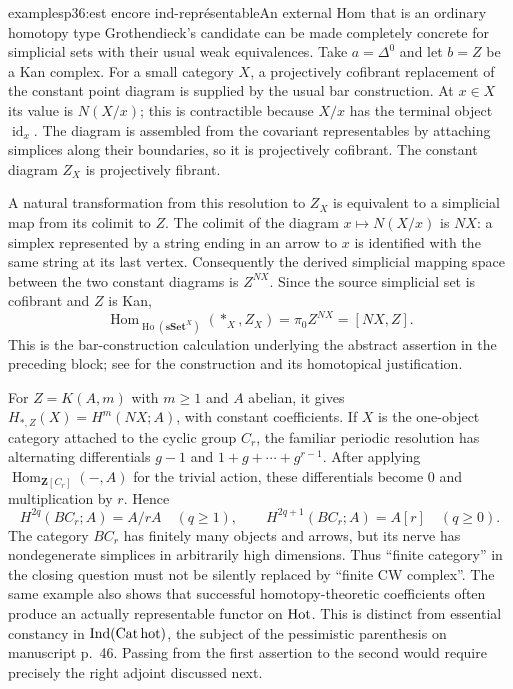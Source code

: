 \begin{dcomment}{examples}{p36:est encore ind-représentable}{An external Hom that is an ordinary homotopy type}
Grothendieck's candidate can be made completely concrete for simplicial sets with their usual weak equivalences. Take $a=\Delta^0$ and let $b=Z$ be a Kan complex. For a small category $X$, a projectively cofibrant replacement of the constant point diagram is supplied by the usual bar construction. At $x\in X$ its value is $N(X/x)$; this is contractible because $X/x$ has the terminal object $\operatorname{id}_x$. The diagram is assembled from the covariant representables by attaching simplices along their boundaries, so it is projectively cofibrant. The constant diagram $Z_X$ is projectively fibrant.

A natural transformation from this resolution to $Z_X$ is equivalent to a simplicial map from its colimit to $Z$. The colimit of the diagram $x\mapsto N(X/x)$ is $NX$: a simplex represented by a string ending in an arrow to $x$ is identified with the same string at its last vertex. Consequently the derived simplicial mapping space between the two constant diagrams is $Z^{NX}$. Since the source simplicial set is cofibrant and $Z$ is Kan,
\[
 \operatorname{Hom}_{\operatorname{Ho}(\mathbf{sSet}^{X})}
       (*_X,Z_X)=\pi_0 Z^{NX}=[NX,Z].
\]
This is the bar-construction calculation underlying the abstract assertion in the preceding block; see \citet[\S\S4.4--4.5 and 5.1]{Riehl2014} for the construction and its homotopical justification.

For $Z=K(A,m)$ with $m\geq1$ and $A$ abelian, it gives $H_{*,Z}(X)=H^m(NX;A)$, with constant coefficients. If $X$ is the one-object category attached to the cyclic group $C_r$, the familiar periodic resolution has alternating differentials $g-1$ and $1+g+\cdots+g^{r-1}$. After applying $\operatorname{Hom}_{\mathbf Z[C_r]}(-,A)$ for the trivial action, these differentials become $0$ and multiplication by $r$. Hence
\[
 H^{2q}(BC_r;A)=A/rA\quad(q\geq1),\qquad
 H^{2q+1}(BC_r;A)=A[r]\quad(q\geq0).
\]
The category $BC_r$ has finitely many objects and arrows, but its nerve has nondegenerate simplices in arbitrarily high dimensions. Thus ``finite category'' in the closing question must not be silently replaced by ``finite CW complex''. The same example also shows that successful homotopy-theoretic coefficients often produce an actually representable functor on $\mathrm{Hot}$. This is distinct from essential constancy in $\operatorname{Ind}(\mathrm{Cat\,hot})$, the subject of the pessimistic parenthesis on manuscript p.~46. Passing from the first assertion to the second would require precisely the right adjoint discussed next.
\end{dcomment}


